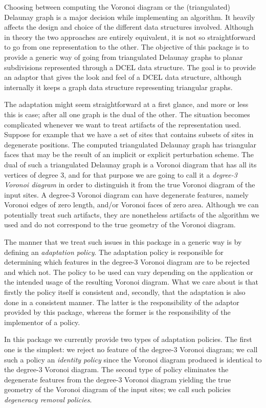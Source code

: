 Choosing between computing the Voronoi diagram or the (triangulated)
Delaunay graph is a major decision while implementing an algorithm. It
heavily affects the design and choice of the different data structures
involved. Although in theory the two approaches are entirely
equivalent, it is not so straightforward to go from one representation
to the other. The objective of this package is to provide a generic
way of going from triangulated Delaunay graphs to planar
subdivisions represented through a DCEL data structure. The goal is to
provide an adaptor that gives the look and feel of a DCEL data structure,
although internally it keeps a graph data structure representing
triangular graphs.

The adaptation might seem straightforward at a first glance, and more
or less this is case; after all one graph is the dual of the
other. The situation becomes complicated whenever we want to treat
artifacts of the representation used. Suppose for example that we have
a set of sites that contains subsets of sites in degenerate
positions. The computed triangulated Delaunay graph has triangular
faces that may be the result of an implicit or explicit perturbation
scheme. The dual of such a triangulated Delaunay graph is a Voronoi
diagram that has all its vertices of degree 3, and for that purpose we
are going to call it a \emph{degree-3 Voronoi diagram} in order to
distinguish it from the true Voronoi diagram of the input sites. A
degree-3 Voronoi diagram can have degenerate features, namely Voronoi
edges of zero length, and/or Voronoi faces of zero area. Although we
can potentially treat such artifacts, they are nonetheless artifacts of
the algorithm we used and do not correspond to the true geometry of
the Voronoi diagram.

The manner that we treat such issues in this package in a generic way
is by defining an \emph{adaptation policy}. The adaptation policy is
responsible for determining which features in the degree-3 Voronoi
diagram are to be rejected and which not. The policy to be used can
vary depending on the application or the intended usage of the
resulting Voronoi diagram. What we care about is that firstly the
policy itself is consistent and, secondly, that the adaptation is also
done in a consistent manner. The latter is the responsibility of the
adaptor provided by this package, whereas the former is the
responsibility of the implementor of a policy.

In this package we currently provide two types of adaptation
policies. The first one is the simplest: we reject no feature of the
degree-3 Voronoi diagram; we call such a policy an
\emph{identity policy} since the Voronoi diagram produced is identical
to the degree-3 Voronoi diagram. The second type of policy eliminates
the degenerate features from the degree-3 Voronoi diagram yielding
the true geometry of the Voronoi diagram of the input sites; we call
such policies \emph{degeneracy removal policies}.

